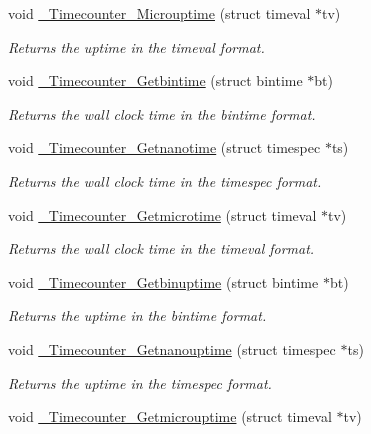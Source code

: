 \begin{DoxyCompactItemize}
void \mbox{\hyperlink{group__RTEMSScoreTimecounter_ga36ddf99626410dfbd01f68db09070df5}{\+\_\+\+Timecounter\+\_\+\+Microuptime}} (struct timeval $\ast$tv)
\begin{DoxyCompactList}\small\item\em Returns the uptime in the timeval format. \end{DoxyCompactList}\item 
void \mbox{\hyperlink{group__RTEMSScoreTimecounter_gaad315babe0faa38d8e287b6354e7e1f7}{\+\_\+\+Timecounter\+\_\+\+Getbintime}} (struct bintime $\ast$bt)
\begin{DoxyCompactList}\small\item\em Returns the wall clock time in the bintime format. \end{DoxyCompactList}\item 
void \mbox{\hyperlink{group__RTEMSScoreTimecounter_gabc2ea691f0d75942be121b9a0afc4429}{\+\_\+\+Timecounter\+\_\+\+Getnanotime}} (struct timespec $\ast$ts)
\begin{DoxyCompactList}\small\item\em Returns the wall clock time in the timespec format. \end{DoxyCompactList}\item 
void \mbox{\hyperlink{group__RTEMSScoreTimecounter_ga84743bc3a2615a6b9d7447317cfcb3dd}{\+\_\+\+Timecounter\+\_\+\+Getmicrotime}} (struct timeval $\ast$tv)
\begin{DoxyCompactList}\small\item\em Returns the wall clock time in the timeval format. \end{DoxyCompactList}\item 
void \mbox{\hyperlink{group__RTEMSScoreTimecounter_ga9a538f7e17a92fb637644a431ce00702}{\+\_\+\+Timecounter\+\_\+\+Getbinuptime}} (struct bintime $\ast$bt)
\begin{DoxyCompactList}\small\item\em Returns the uptime in the bintime format. \end{DoxyCompactList}\item 
void \mbox{\hyperlink{group__RTEMSScoreTimecounter_gaa05abad208a8fbd882c71cc45c18342b}{\+\_\+\+Timecounter\+\_\+\+Getnanouptime}} (struct timespec $\ast$ts)
\begin{DoxyCompactList}\small\item\em Returns the uptime in the timespec format. \end{DoxyCompactList}\item 
void \mbox{\hyperlink{group__RTEMSScoreTimecounter_ga2e0c99585b4849dffa58b2ac55cfc550}{\+\_\+\+Timecounter\+\_\+\+Getmicrouptime}} (struct timeval $\ast$tv)

\end{DoxyCompactItemize}
